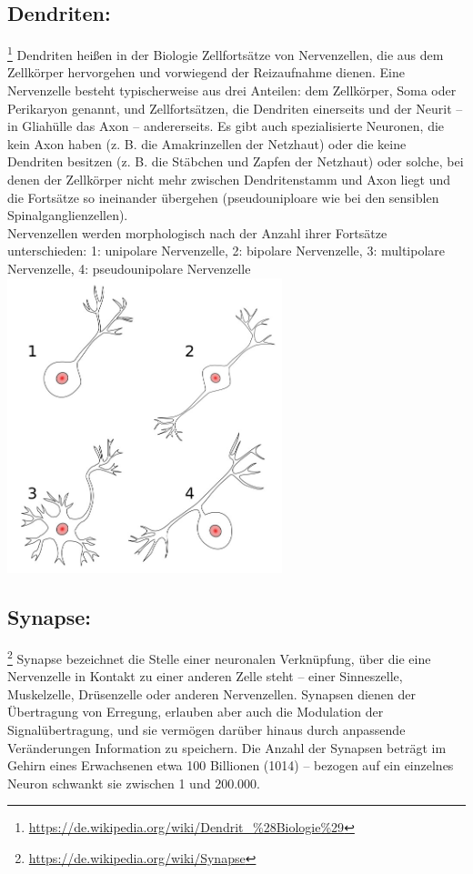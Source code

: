 \subsection{Dendriten:}\footnote{\url{https://de.wikipedia.org/wiki/Dendrit_\%28Biologie\%29}} Dendriten heißen in der Biologie Zellfortsätze von Nervenzellen, die aus dem Zellkörper hervorgehen und vorwiegend der Reizaufnahme dienen. Eine Nervenzelle besteht typischerweise aus drei Anteilen: dem Zellkörper, Soma oder Perikaryon genannt, und Zellfortsätzen, die Dendriten einerseits und der Neurit – in Gliahülle das Axon – andererseits. Es gibt auch spezialisierte Neuronen, die kein Axon haben (z. B. die Amakrinzellen der Netzhaut) oder die keine Dendriten besitzen (z. B. die Stäbchen und Zapfen der Netzhaut) oder solche, bei denen der Zellkörper nicht mehr zwischen Dendritenstamm und Axon liegt und die Fortsätze so ineinander übergehen (pseudouniploare wie bei den sensiblen Spinalganglienzellen).
\\
Nervenzellen werden morphologisch nach der Anzahl ihrer Fortsätze unterschieden:
1: unipolare Nervenzelle, 2: bipolare Nervenzelle, 3: multipolare Nervenzelle, 4: pseudounipolare Nervenzelle\\
\includegraphics[width=0.6\textwidth]{lectures/160405/pix/dendrite.jpg}

\subsection{Synapse:}\footnote{\url{https://de.wikipedia.org/wiki/Synapse}} Synapse bezeichnet die Stelle einer neuronalen Verknüpfung, über die eine Nervenzelle in Kontakt zu einer anderen Zelle steht – einer Sinneszelle, Muskelzelle, Drüsenzelle oder anderen Nervenzellen. Synapsen dienen der Übertragung von Erregung, erlauben aber auch die Modulation der Signalübertragung, und sie vermögen darüber hinaus durch anpassende Veränderungen Information zu speichern. Die Anzahl der Synapsen beträgt im Gehirn eines Erwachsenen etwa 100 Billionen (1014) – bezogen auf ein einzelnes Neuron schwankt sie zwischen 1 und 200.000.

